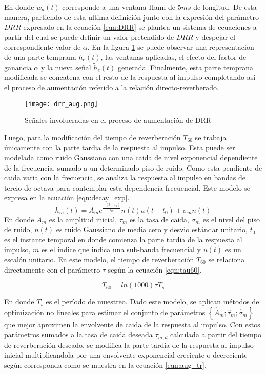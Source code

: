 En donde $w_{d}(t)$ corresponde a una ventana Hann de $5 ms$ de longitud. De esta manera, partiendo de esta ultima definición junto con la expresión del parámetro $DRR$ expresado en la ecuación \ref{eqn:DRR} se plantea un sistema de ecuaciones a partir del cual se puede definir un valor pretendido de $DRR$ y despejar el correspondiente valor de $\alpha$. En la figura \ref{fig:drr_aug} se puede observar una representacion de una parte temprana $h_{e}(t)$, las ventanas aplicadas, el efecto del factor de ganancia $\alpha$ y la nueva señal $\tilde{h}_{e}(t)$ generada. Finalmente, esta parte temprana modificada se concatena con el resto de la respuesta al impulso completando asi el proceso de aumentación referido a la relación directo-reverberado.

\begin{figure}[H]
	\centering{}
	\texttt{[image: drr\_aug.png]}
	\caption{Señales involucradas en el proceso de aumentación de DRR}
	\label{fig:drr_aug}
\end{figure}

Luego, para la modificación del tiempo de reverberación $T_{60}$ se trabaja únicamente con la parte tardia de la respuesta al impulso. Esta puede ser modelada como ruido Gaussiano con una caida de nivel exponencial dependiente de la frecuencia, sumado a un determinado piso de ruido. Como esta pendiente de caida varia con la frecuencia, se analiza la respuesta al impulso en bandas de tercio de octava para contemplar esta dependencia frecuencial. Este modelo se expresa en la ecuación \ref{eqn:decay_exp}. 
\begin{equation}
\label{eqn:decay_exp}
	h_{m}(t) = A_{m} e^{\frac{-(t-t_{0})}{\tau_{m}}}n(t)u(t-t_{0})+\sigma_{m}n(t)
\end{equation} 
En donde $A_{m}$ es la amplitud inicial, $\tau_{m}$ es la tasa de caida, $\sigma_{m}$ es el nivel del piso de ruido, $n(t)$ es ruido Gaussiano de media cero y desvio estándar unitario, $t_{0}$ es el instante temporal en donde comienza la parte tardia de la respuesta al impulso, $m$ es el indice que indica una sub-banda frecuencial y $u(t)$ es un escalón unitario. En este modelo, el tiempo de reverberación $T_{60}$ se relaciona directamente con el parámetro $\tau$ según la ecuación \ref{eqn:tau60}.

\begin{equation}
\label{eqn:tau60}
	T_{60} = ln(1000)\tau T_{s}
\end{equation}

En donde $T_{s}$ es el período de muestreo. Dado este modelo, se aplican métodos de optimización no lineales para estimar el conjunto de parámetros $\left \{ \hat{A}_{m}; \hat{\tau}_{m}; \hat{\sigma}_{m} \right \}$ que mejor aproximen la envolvente de caida de la respuesta al impulso. Con estos parámetros sumados a la tasa de caida deseada $\tau_{m,d}$ calculada a partir del tiempo de reverberación deseado, se modifica la parte tardia de la respuesta al impulso inicial multiplicandola por una envolvente exponencial creciente o decreciente según corresponda como se muestra en la ecuación  \ref{eqn:aug_tr}.

